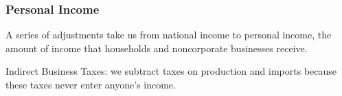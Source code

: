 \documentclass[12pt]{article}
\begin{document}
\subsubsection{Personal Income}
A series of adjustments take us from national income to personal income, the amount of 
income that households and noncorporate businesses receive.

\begin{figure}[H]
\end{figure}

Indirect Business Taxes: we subtract taxes on production and imports because these taxes
never enter anyone’s income.









%
%
\end{document}
